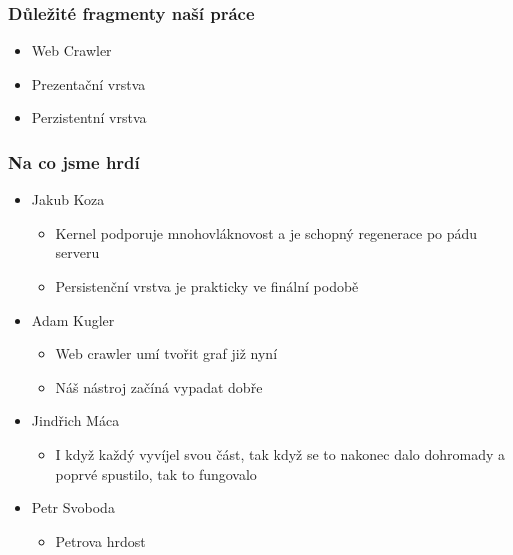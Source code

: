 \documentclass{beamer}
\begin{document}
\begin{frame}[allowframebreaks]\frametitle{Důležité fragmenty naší práce}
  \begin{itemize}
    \item Web Crawler
		\item Prezentační vrstva
		\item Perzistentní vrstva
  \end{itemize}
\end{frame}

\begin{frame}[allowframebreaks]\frametitle{Na co jsme hrdí} 
  \begin{itemize}
    \item Jakub Koza
      \begin{itemize}
       \item Kernel podporuje mnohovláknovost a je schopný regenerace po pádu serveru
       \item Persistenční vrstva je prakticky ve finální podobě
     \end{itemize}
   
    \item Adam Kugler
      \begin{itemize}
       \item Web crawler umí tvořit graf již nyní
       \item Náš nástroj začíná vypadat dobře
     \end{itemize}

    \item Jindřich Máca
      \begin{itemize}
       \item I když každý vyvíjel svou část, tak když se to nakonec dalo dohromady a poprvé spustilo, tak to fungovalo
      \end{itemize}  
   
    \item Petr Svoboda
      \begin{itemize}
       \item Petrova hrdost
     \end{itemize}
   \end{itemize}  
\end{frame}
\end{document}
